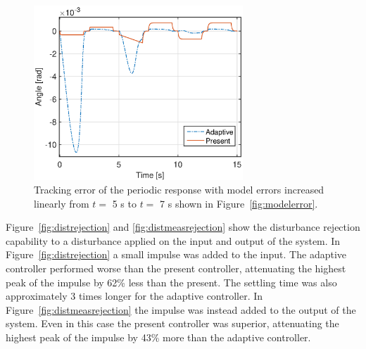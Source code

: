 \begin{figure}[h!]
  \centering
  \includegraphics[width=0.7\textwidth]{fig/matlab/modelerrorperiodic_trackingerror.eps}
  \caption{\label{fig:modelerror_trackingerror} Tracking error of the periodic response with model errors increased linearly from $t=$ 5 s to $t=$ 7 s shown in Figure~\ref{fig:modelerror}.}
\end{figure}

\FloatBarrier
Figure~\ref{fig:distrejection} and \ref{fig:distmeasrejection} show the disturbance rejection capability to a disturbance applied on the input and output of the system. In Figure~\ref{fig:distrejection} a small impulse was added to the input. The adaptive controller performed worse than the present controller, attenuating the highest peak of the impulse by 62\% less than the present. The settling time was also approximately 3 times longer for the adaptive controller. In Figure~\ref{fig:distmeasrejection} the impulse was instead added to the output of the system. Even in this case the present controller was superior, attenuating the highest peak of the impulse by 43\%  more than the adaptive controller.

